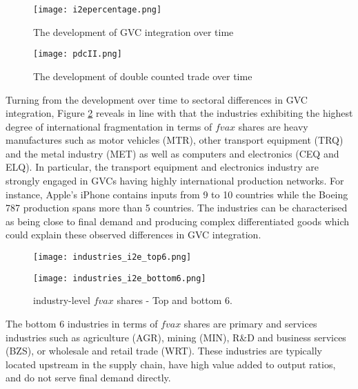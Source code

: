 \documentclass[a4paper,11pt]{article}
\begin{document}
\begin{figure}
\centering
\begin{minipage}{0.49\textwidth}
\vspace{0.8cm}
\centering
\texttt{[image: i2epercentage.png]}
\caption{The development of GVC integration over time}
\label{fig:fvax_t}
\end{minipage}\hfill
\begin{minipage}{0.49\textwidth}
\vspace{0.8cm}
\centering
\texttt{[image: pdcII.png]}
\caption{The development of double counted trade over time}
\label{fig:pdc_t}
\end{minipage}
\end{figure}

Turning from the development over time to sectoral differences in GVC integration, Figure \ref{fig:fvax_s} reveals in line with \citet{rojoguno12b} that the industries exhibiting the highest degree of international fragmentation in terms of $fvax$ shares are heavy manufactures such as motor vehicles (MTR), other transport equipment (TRQ) and the metal industry (MET) as well as computers and electronics (CEQ and ELQ). In particular, the transport equipment and electronics industry are strongly engaged in GVCs having highly international production networks. For instance, Apple's iPhone contains inputs from 9 to 10 countries while the Boeing 787 production spans more than 5 countries. The industries can be characterised as being close to final demand and producing complex differentiated goods which could explain these observed differences in GVC integration.

\begin{figure}[b!]
\centering
\begin{minipage}{0.45\textwidth}
\centering
\texttt{[image: industries\_i2e\_top6.png]}
\end{minipage}\hfill
\begin{minipage}{0.45\textwidth}
\centering
\texttt{[image: industries\_i2e\_bottom6.png]}
\end{minipage}
\caption{industry-level $fvax$ shares - Top and bottom 6.}
\label{fig:fvax_s}
\end{figure}

The bottom 6 industries in terms of $fvax$ shares are primary and services industries such as agriculture (AGR), mining (MIN), R\&D and business services (BZS), or wholesale and retail trade (WRT). These industries are typically located upstream in the supply chain, have high value added to output ratios, and do not serve final demand directly.
\end{document}

